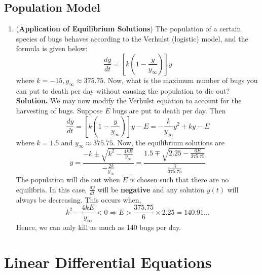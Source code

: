 \documentclass[a4paper]{article}
\begin{document}
\subsection{Population Model}
\begin{enumerate}
    \item (\textbf{Application of Equilibrium Solutions}) The population of a certain species of bugs behaves according to the Verhulst (logistic) model, and the formula is given below:
    \begin{equation}
        \frac{dy}{dt}=[k(1-\frac{y}{y_\infty})]y
    \end{equation}
    where $k=-15, y_{\infty}\approx375.75$. Now, what is the maximum number of bugs you can put to death per day without causing the population to die out? \newline
    \textbf{Solution.} We may now modify the Verhulst equation to account for the harvesting of bugs. Suppose $E$ bugs are put to death per day. Then
    \begin{equation*}
        \frac{dy}{dt}=[k(1-\frac{y}{y_{\infty}})]y-E=-\frac{k}{y_\infty}y^2+ky-E
    \end{equation*}
    where $k=1.5$ and $y_\infty\approx375.75$. Now, the equilibrium solutions are
    \begin{equation*}
        y=\frac{-k\pm\sqrt{k^2-\frac{4kE}{y_\infty}}}{-\frac{2k}{y_\infty}}=\frac{1.5\mp\sqrt{2.25-\frac{6E}{375.75}}}{\frac{3}{375.75}}
    \end{equation*}
    The population will die out when $E$ is chosen such that there are no equilibria. In this case, $\frac{dy}{dt}$ will be \textbf{negative} and any solution $y(t)$ will always be decreasing. This occurs when,
    \begin{equation*}
        k^2-\frac{4kE}{y_\infty}<0\Rightarrow E>\frac{375.75}{6}\times2.25=140.91\dots
    \end{equation*}
    Hence, we can only kill as much as 140 bugs per day.
\end{enumerate}
\newpage
\section{Linear Differential Equations}
\end{document}
